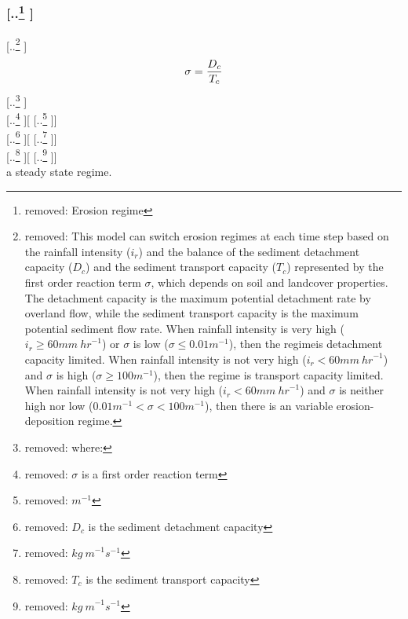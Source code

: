 \documentclass[gmd, manuscript]{copernicus}
\providecommand{\DIFadd}[1]{{\protect\color{blue} \sf #1}} %
\providecommand{\DIFdel}[1]{{\protect\color{red} [..\footnote{removed: #1} ]}} %
\providecommand{\DIFaddbegin}{} %
\providecommand{\DIFaddend}{} %
\providecommand{\DIFdelend}{} %
\begin{document}

\subsubsection{\DIFdel{Erosion regime}}
\addtocounter{subsubsection}{-1}%

\DIFdel{This model can switch erosion regimes at each time step
based on the rainfall intensity ($i_r$)
and the balance of the sediment detachment capacity ($D_c$)
and the sediment transport capacity ($T_c$)
represented by the first order reaction term $\sigma$, 
which depends on soil and landcover properties.
The detachment capacity is the maximum potential 
detachment rate by overland flow, while
the sediment transport capacity 
is the maximum potential sediment flow rate.
When rainfall intensity is very high ($i_r \geq 60 \unit{mm~hr}^{-1}$)
or $\sigma$ is low ($\sigma \leq 0.01 \unit{m}^{-1}$),
then the regimeis detachment capacity limited. 
When rainfall intensity is not very high ($i_r < 60 \unit{mm~hr}^{-1} $)
and $\sigma$ is high ($\sigma \geq 100 \unit{m}^{-1}$),
then the regime is transport capacity limited. 
When rainfall intensity is not very high 
($i_r<60 \unit{mm~hr}^{-1}$)
and $\sigma$ is neither high nor low 
($ 0.01 \unit{m}^{-1}< \sigma < 100 \unit{m}^{-1}$),
then there is an variable erosion-deposition regime. }%
\begin{displaymath}
\sigma = {D_c \over T_c}
\end{displaymath}
{\DIFdel{\small
\noindent
where: }\\
\DIFdel{\noindent
\hspace*{0.5em} $\sigma$  is a first order reaction term }[\DIFdel{$\unit{m}^{-1}$}]\\
\DIFdel{\hspace*{0.5em} $D_c$ is the sediment detachment capacity }[\DIFdel{$\unit{kg~m}^{-1}s^{-1}$}]\\
\DIFdel{\hspace*{0.5em} $T_c$ is the sediment transport capacity }[\DIFdel{$\unit{kg~m}^{-1}s^{-1}$}]\\
}
\DIFdelend \DIFaddbegin \DIFadd{a steady state regime. 
}\DIFaddend 
\end{document}
